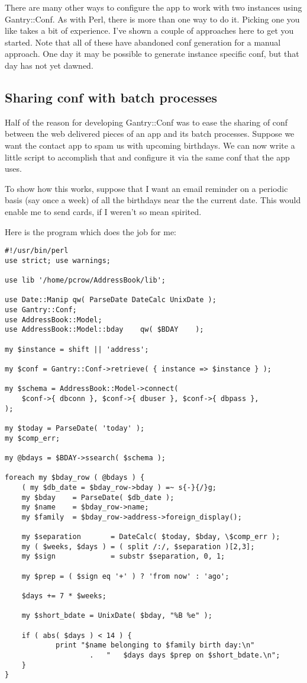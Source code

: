 There are many other ways to configure the app to work with two instances
using Gantry::Conf.  As with Perl, there is more than one way to do it.
Picking one you like takes a bit of experience.  I've shown a couple of
approaches here to get you started.  Note that all of these have abandoned
conf generation for a manual approach.  One day it may be possible to
generate instance specific conf, but that day has not yet dawned.

\subsection{Sharing conf with batch processes}

Half of the reason for developing Gantry::Conf was to ease the sharing of
conf between the web delivered pieces of an app and its batch processes.
Suppose we want the contact app to spam us with upcoming birthdays.
We can now write a little script to accomplish that and configure it via
the same conf that the app uses.

To show how this works, suppose that I want an email reminder on a periodic
basis (say once a week) of all the birthdays near the the current date.
This would enable me to send cards, if I weren't so mean spirited.

Here is the program which does the job for me:

\begin{verbatim}
#!/usr/bin/perl
use strict; use warnings;

use lib '/home/pcrow/AddressBook/lib';

use Date::Manip qw( ParseDate DateCalc UnixDate );
use Gantry::Conf;
use AddressBook::Model;
use AddressBook::Model::bday    qw( $BDAY    );

my $instance = shift || 'address';

my $conf = Gantry::Conf->retrieve( { instance => $instance } );

my $schema = AddressBook::Model->connect(
    $conf->{ dbconn }, $conf->{ dbuser }, $conf->{ dbpass },
);

my $today = ParseDate( 'today' );
my $comp_err;

my @bdays = $BDAY->ssearch( $schema );

foreach my $bday_row ( @bdays ) {
    ( my $db_date = $bday_row->bday ) =~ s{-}{/}g;
    my $bday    = ParseDate( $db_date );
    my $name    = $bday_row->name;
    my $family  = $bday_row->address->foreign_display();

    my $separation       = DateCalc( $today, $bday, \$comp_err );
    my ( $weeks, $days ) = ( split /:/, $separation )[2,3];
    my $sign             = substr $separation, 0, 1;

    my $prep = ( $sign eq '+' ) ? 'from now' : 'ago';

    $days += 7 * $weeks;

    my $short_bdate = UnixDate( $bday, "%B %e" );

    if ( abs( $days ) < 14 ) {
            print "$name belonging to $family birth day:\n"
                    .   "   $days days $prep on $short_bdate.\n";
    }
}
\end{verbatim}

